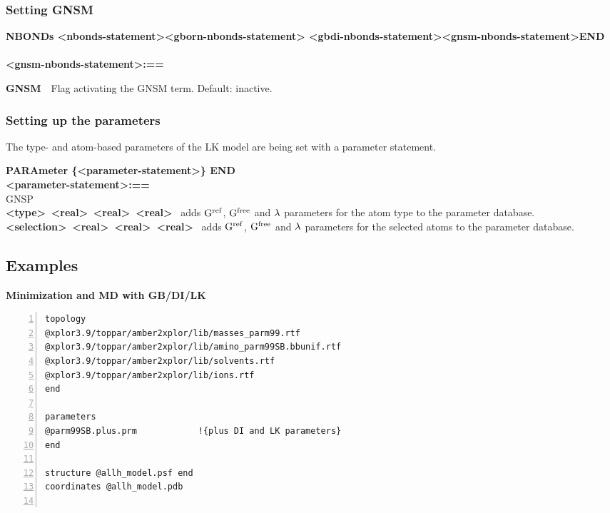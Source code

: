 \documentclass[12pt]{report}
\begin{document}
{\subsubsection{Setting GNSM}
\noindent\textbf{NBONDs \textless nbonds-statement\textgreater  \textbar \textless gborn-nbonds-statement\textgreater 
\textbar \textless gbdi-nbonds-statement\textgreater \textbar \textless gnsm-nbonds-statement\textgreater  END} \\ \\
\textbf{\textless gnsm-nbonds-statement\textgreater :==} 

\textbf{GNSM} \,\, Flag activating the GNSM term. Default: inactive.

\subsubsection{Setting up the parameters}
The type- and atom-based  parameters of the LK model are being set with a parameter statement. 

\noindent\textbf{PARAmeter \{\textless parameter-statement\textgreater\} END}\\   
\textbf{\textless parameter-statement\textgreater :==}\\
GNSP \\
\textbf{\textless type\textgreater \, \textless real\textgreater\, \textless real\textgreater\ \textless real\textgreater} 
\, adds $\rm G^{ref}$, $\rm G^{free}$ and $\rm \lambda$ parameters for the atom type to the parameter database. \\ 
\textbf{\textless selection\textgreater \, \textless real\textgreater\, \textless real\textgreater\ \textless real\textgreater} 
\, adds $\rm G^{ref}$, $\rm G^{free}$ and $\rm \lambda$ parameters for the selected atoms to the parameter database. 

\subsection{Examples}
\textbf{Minimization and MD with GB/DI/LK} 
\begin{lstlisting}[numbers=left, numbersep=5pt,numberstyle=\tiny\color{black}]
topology
@xplor3.9/toppar/amber2xplor/lib/masses_parm99.rtf
@xplor3.9/toppar/amber2xplor/lib/amino_parm99SB.bbunif.rtf
@xplor3.9/toppar/amber2xplor/lib/solvents.rtf
@xplor3.9/toppar/amber2xplor/lib/ions.rtf
end

parameters
@parm99SB.plus.prm		      !{plus DI and LK parameters}
end

structure @allh_model.psf end
coordinates @allh_model.pdb


\end{lstlisting}}
\end{document}
